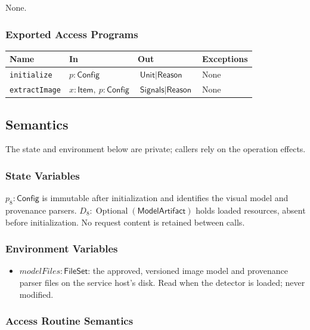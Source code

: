 \documentclass[12pt, titlepage]{article}
\newcommand{\ty}[1]{\textsf{#1}}
\begin{document}
None.

\subsubsection{Exported Access Programs}

\begin{center}
\begin{tabular}{p{3.3cm} p{4cm} p{4cm} p{2.4cm}}
\hline
\textbf{Name} & \textbf{In} & \textbf{Out} & \textbf{Exceptions} \\
\hline
\texttt{initialize} & $p:\ty{Config}$ & $\ty{Unit}\mid\ty{Reason}$ & None \\
\texttt{extractImage} & $x:\ty{Item},\ p:\ty{Config}$ & $\ty{Signals}\mid\ty{Reason}$ & None \\
\hline
\end{tabular}
\end{center}

\subsection{Semantics}

The state and environment below are private; callers rely on the operation effects.

\subsubsection{State Variables}

$p_8:\ty{Config}$ is immutable after initialization and identifies the visual model and provenance parsers. $D_8:\operatorname{Optional}(\ty{ModelArtifact})$ holds loaded resources, absent before initialization. No request content is retained between calls.

\subsubsection{Environment Variables}

\begin{itemize}
\item $\mathit{modelFiles}:\ty{FileSet}$: the approved, versioned image model and provenance parser files on the service host's disk. Read when the detector is loaded; never modified.
\end{itemize}

\subsubsection{Access Routine Semantics}
\end{document}
